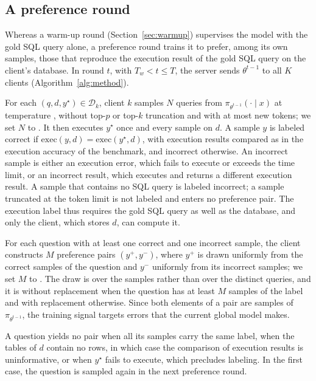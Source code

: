 \subsection{A preference round}\label{sec:pref-round}

Whereas a warm-up round (Section~\ref{sec:warmup}) supervises the model
with the gold SQL query alone, a preference round trains it to prefer,
among its own samples, those that reproduce the execution result of the
gold SQL query on the client's database. In round $t$, with
$T_w < t \le T$, the server sends $\theta^{t-1}$ to all $K$ clients
(Algorithm~\ref{alg:method}).

For each $(q, d, y^\star) \in \mathcal{D}_k$, client $k$ samples $N$
queries from $\pi_{\theta^{t-1}}(\cdot \mid x)$ at temperature
, without top-$p$ or top-$k$ truncation and with at most
 new tokens; we set $N$ to .
It then executes $y^\star$ once and every sample on $d$. A sample $y$ is
labeled correct if $\mathrm{exec}(y, d) = \mathrm{exec}(y^\star, d)$,
with execution results compared as in the execution accuracy of the
benchmark, and incorrect otherwise. An incorrect sample is either an
execution error, which fails to execute or exceeds the time limit, or an
incorrect result, which executes and returns a different execution
result. A sample that contains no SQL query is labeled incorrect; a
sample truncated at the token limit is not labeled and enters no
preference pair. The execution label thus requires the gold SQL query as
well as the database, and only the client, which stores $d$, can compute
it.

For each question with at least one correct and one incorrect sample,
the client constructs $M$ preference pairs $(y^{+}, y^{-})$, where
$y^{+}$ is drawn uniformly from the correct samples of the question and
$y^{-}$ uniformly from its incorrect samples; we set $M$ to
. The draw is over the samples rather than over the
distinct queries, and it is without replacement when the question has at
least $M$ samples of the label and with replacement otherwise. Since
both elements of a pair are samples of $\pi_{\theta^{t-1}}$, the
training signal targets errors that the current global model makes.

A question yields no pair when all its samples carry the same label,
when the tables of $d$ contain no rows, in which case the comparison of
execution results is uninformative, or when $y^\star$ fails to execute,
which precludes labeling. In the first case, the question is sampled
again in the next preference round.

